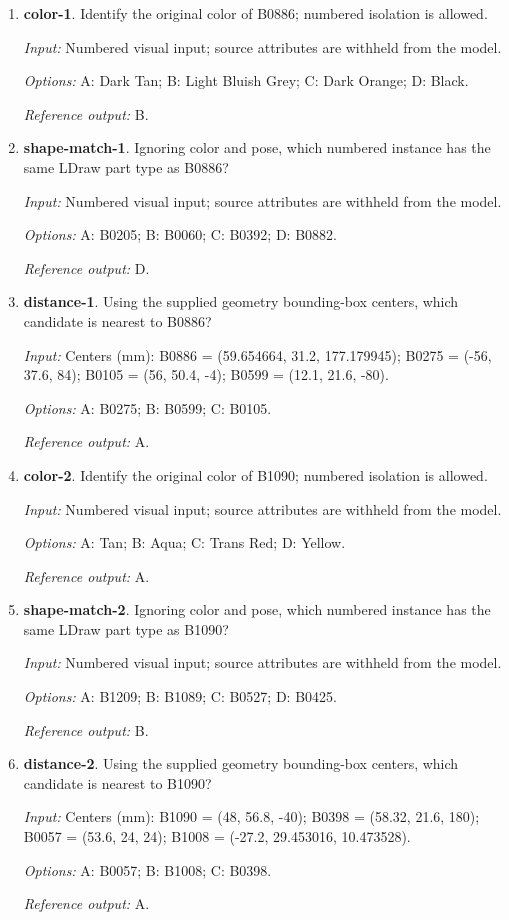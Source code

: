 \begin{enumerate}
\item \textbf{color-1}. Identify the original color of B0886; numbered isolation is allowed.\par {\small \textit{Input:} Numbered visual input; source attributes are withheld from the model. \par\textit{Options:} A: Dark Tan; B: Light Bluish Grey; C: Dark Orange; D: Black. \par\textit{Reference output:} B.}
\item \textbf{shape-match-1}. Ignoring color and pose, which numbered instance has the same LDraw part type as B0886?\par {\small \textit{Input:} Numbered visual input; source attributes are withheld from the model. \par\textit{Options:} A: B0205; B: B0060; C: B0392; D: B0882. \par\textit{Reference output:} D.}
\item \textbf{distance-1}. Using the supplied geometry bounding-box centers, which candidate is nearest to B0886?\par {\small \textit{Input:} Centers (mm): B0886 = (59.654664, 31.2, 177.179945); B0275 = (-56, 37.6, 84); B0105 = (56, 50.4, -4); B0599 = (12.1, 21.6, -80). \par\textit{Options:} A: B0275; B: B0599; C: B0105. \par\textit{Reference output:} A.}
\item \textbf{color-2}. Identify the original color of B1090; numbered isolation is allowed.\par {\small \textit{Input:} Numbered visual input; source attributes are withheld from the model. \par\textit{Options:} A: Tan; B: Aqua; C: Trans Red; D: Yellow. \par\textit{Reference output:} A.}
\item \textbf{shape-match-2}. Ignoring color and pose, which numbered instance has the same LDraw part type as B1090?\par {\small \textit{Input:} Numbered visual input; source attributes are withheld from the model. \par\textit{Options:} A: B1209; B: B1089; C: B0527; D: B0425. \par\textit{Reference output:} B.}
\item \textbf{distance-2}. Using the supplied geometry bounding-box centers, which candidate is nearest to B1090?\par {\small \textit{Input:} Centers (mm): B1090 = (48, 56.8, -40); B0398 = (58.32, 21.6, 180); B0057 = (53.6, 24, 24); B1008 = (-27.2, 29.453016, 10.473528). \par\textit{Options:} A: B0057; B: B1008; C: B0398. \par\textit{Reference output:} A.}

\end{enumerate}
